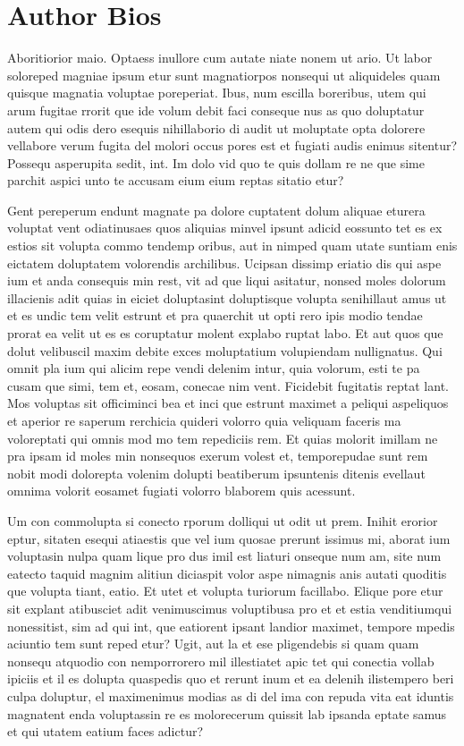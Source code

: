 \chapter*{Author Bios}
Aboritiorior maio. Optaess inullore cum autate niate nonem ut ario. Ut labor soloreped magniae ipsum etur sunt magnatiorpos nonsequi ut aliquideles quam quisque magnatia voluptae poreperiat.
Ibus, num escilla boreribus, utem qui arum fugitae rrorit que ide volum debit faci conseque nus as quo doluptatur autem qui odis dero esequis nihillaborio di audit ut moluptate opta dolorere vellabore verum fugita del molori occus pores est et fugiati audis enimus sitentur?
Possequ asperupita sedit, int.
Im dolo vid quo te quis dollam re ne que sime parchit aspici unto te accusam eium eium reptas sitatio etur?

Gent pereperum endunt magnate pa dolore cuptatent dolum aliquae eturera voluptat vent odiatinusaes quos aliquias minvel ipsunt adicid eossunto tet es ex estios sit volupta commo tendemp oribus, aut in nimped quam utate suntiam enis eictatem doluptatem volorendis archilibus.
Ucipsan dissimp eriatio dis qui aspe ium et anda consequis min rest, vit ad que liqui asitatur, nonsed moles dolorum illacienis adit quias in eiciet doluptasint doluptisque volupta senihillaut amus ut et es undic tem velit estrunt et pra quaerchit ut opti rero ipis modio tendae prorat ea velit ut es es coruptatur molent explabo ruptat labo. Et aut quos que dolut velibuscil maxim debite exces moluptatium volupiendam nullignatus.
Qui omnit pla ium qui alicim repe vendi delenim intur, quia volorum, esti te pa cusam que simi, tem et, eosam, conecae nim vent.
Ficidebit fugitatis reptat lant.
Mos voluptas sit officiminci bea et inci que estrunt maximet a peliqui aspeliquos et aperior re saperum rerchicia quideri volorro quia veliquam faceris ma voloreptati qui omnis mod mo tem repediciis rem. Et quias molorit imillam ne pra ipsam id moles min nonsequos exerum volest et, temporepudae sunt rem nobit modi dolorepta volenim dolupti beatiberum ipsuntenis ditenis evellaut omnima volorit eosamet fugiati volorro blaborem quis acessunt.

Um con commolupta si conecto rporum dolliqui ut odit ut prem. Inihit erorior eptur, sitaten esequi atiaestis que vel ium quosae prerunt issimus mi, aborat ium voluptasin nulpa quam lique pro dus imil est liaturi onseque num am, site num eatecto taquid magnim alitiun diciaspit volor aspe nimagnis anis autati quoditis que volupta tiant, eatio. Et utet et volupta turiorum facillabo. Elique pore etur sit explant atibusciet adit venimuscimus voluptibusa pro et et estia venditiumqui nonessitist, sim ad qui int, que eatiorent ipsant landior maximet, tempore mpedis aciuntio tem sunt reped etur?
Ugit, aut la et ese pligendebis si quam quam nonsequ atquodio con nemporrorero mil illestiatet apic tet qui conectia vollab ipiciis et il es dolupta quaspedis quo et rerunt inum et ea delenih ilistempero beri culpa doluptur, el maximenimus modias as di del ima con repuda vita eat iduntis magnatent enda voluptassin re es molorecerum quissit lab ipsanda eptate samus et qui utatem eatium faces adictur? 


